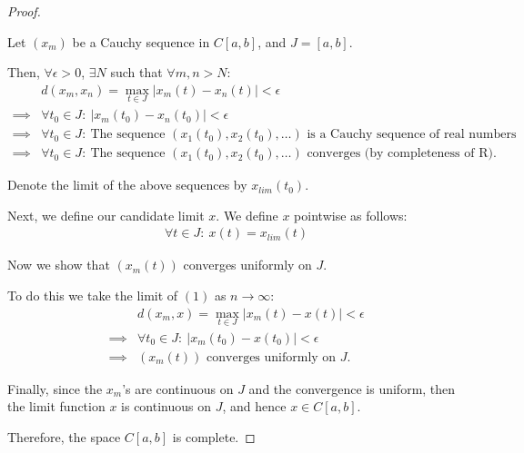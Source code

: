\documentclass{article}
\newenvironment{customthm}[1]
  {\renewcommand\theinnercustomthm{#1}\innercustomthm}
  {\endinnercustomthm}
\theoremstyle{definition}
\begin{document}
\begin{proof}
  $ $

  Let $(x_m)$ be a Cauchy sequence in $C[a,b]$, and $J = [a, b]$.
  \newline

  Then, $\forall \epsilon > 0$, $\exists N$ such that $\forall m,n > N$:
  \begin{align}
    &d(x_m, x_n) = \max\limits_{t \in J} | x_m(t) - x_n(t) | < \epsilon \\
    \implies& \forall t_0 \in J: \: | x_m(t_0) - x_n(t_0) | < \epsilon \nonumber \\
    \implies& \forall t_0 \in J: \: \text{The sequence } (x_1(t_0), x_2(t_0), \ldots) \text{ is a Cauchy sequence of real numbers} \nonumber \\
    \implies& \forall t_0 \in J: \: \text{The sequence } (x_1(t_0), x_2(t_0), \ldots) \text{ converges (by completeness of R)}. \nonumber
  \end{align}

  Denote the limit of the above sequences by $x_{lim}(t_0)$.
  \newline
  
  Next, we define our candidate limit $x$. We define $x$ pointwise as follows:
  \begin{align*}
    \forall t \in J: \: x(t) = x_{lim}(t)
  \end{align*}

  Now we show that $(x_m(t))$ converges uniformly on $J$.
  
  To do this we take the limit of $(1)$ as $n \to \infty$:
  \begin{align*}
    &d(x_m, x) = \max\limits_{t \in J} | x_m(t) - x(t) | < \epsilon \\
    \implies& \forall t_0 \in J: \: | x_m(t_0) - x(t_0) | < \epsilon \\
    \implies& (x_m(t)) \text{ converges uniformly on } J.
  \end{align*}

  Finally, since the $x_m$'s are continuous on $J$ and the convergence is uniform, then the limit function $x$ is continuous on $J$, and hence $x \in C[a,b]$.
  \newline

  Therefore, the space $C[a,b]$ is complete.

\end{proof}

\newpage

\setcounter{equation}{0}
\begin{customthm}{3}[Compactness]
\end{customthm}
\end{document}

